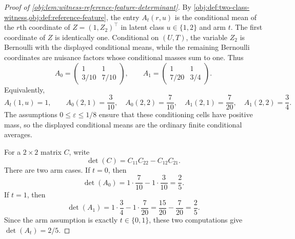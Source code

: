 \begin{proof}[Proof of \cref{obj:lem:witness-reference-feature-determinant}]
By \cref{obj:def:two-class-witness,obj:def:reference-feature}, the entry \(A_t(r,u)\) is the conditional mean of the \(r\)th coordinate of \(Z=(1,Z_2)^\top\) in latent class \(u\in\{1,2\}\) and arm \(t\). The first coordinate of \(Z\) is identically one. Conditional on \((U,T)\), the variable \(Z_2\) is Bernoulli with the displayed conditional means, while the remaining Bernoulli coordinates are nuisance factors whose conditional masses sum to one. Thus
\[
A_0
=
\begin{pmatrix}
1&1\\[0.2em]
3/10&7/10
\end{pmatrix},
\qquad
A_1
=
\begin{pmatrix}
1&1\\[0.2em]
7/20&3/4
\end{pmatrix}.
\]
Equivalently,
\[
A_t(1,u)=1,\qquad
A_0(2,1)=\frac{3}{10},\quad
A_0(2,2)=\frac{7}{10},\quad
A_1(2,1)=\frac{7}{20},\quad
A_1(2,2)=\frac34 .
\]
The assumptions \(0\le\varepsilon\le1/8\) ensure that these conditioning cells have positive mass, so the displayed conditional means are the ordinary finite conditional averages. %

For a \(2\times2\) matrix \(C\), write
\[
\det(C)=C_{11}C_{22}-C_{12}C_{21}.
\]
There are two arm cases. If \(t=0\), then
\[
\det(A_0)
=
1\cdot\frac{7}{10}-1\cdot\frac{3}{10}
=
\frac25 .
\]
If \(t=1\), then
\[
\det(A_1)
=
1\cdot\frac34-1\cdot\frac{7}{20}
=
\frac{15}{20}-\frac{7}{20}
=
\frac25 .
\]
Since the arm assumption is exactly \(t\in\{0,1\}\), these two computations give \(\det(A_t)=2/5\). %
\end{proof}
